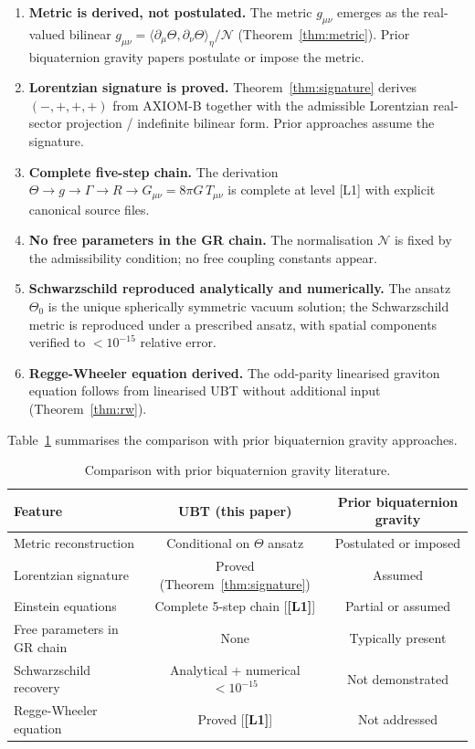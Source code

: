\documentclass[12pt,a4paper]{article}
\theoremstyle{definition}
\theoremstyle{remark}
\newcommand{\Lone}{\textbf{[L1]}}
\newcommand{\calN}{\mathcal{N}}
\begin{document}
\begin{enumerate}
  \item \textbf{Metric is derived, not postulated.}
        The metric $g_{\mu\nu}$ emerges as the real-valued bilinear
        $g_{\mu\nu} = \langle\partial_\mu\Theta,\partial_\nu\Theta\rangle_\eta/\calN$
        (Theorem~\ref{thm:metric}).
        Prior biquaternion gravity papers postulate or impose the metric.

  \item \textbf{Lorentzian signature is proved.}
        Theorem~\ref{thm:signature} derives $(-,+,+,+)$ from AXIOM-B together with the
        admissible Lorentzian real-sector projection / indefinite bilinear form.
        Prior approaches assume the signature.

  \item \textbf{Complete five-step chain.}
        The derivation $\Theta \to g \to \Gamma \to R \to G_{\mu\nu} = 8\pi G\,T_{\mu\nu}$
        is complete at level [L1] with explicit canonical source files.

  \item \textbf{No free parameters in the GR chain.}
        The normalisation $\calN$ is fixed by the admissibility condition;
        no free coupling constants appear.

  \item \textbf{Schwarzschild reproduced analytically and numerically.}
        The ansatz $\Theta_0$ is the unique spherically symmetric vacuum solution;
        the Schwarzschild metric is reproduced under a prescribed ansatz, with spatial components verified to
        $< 10^{-15}$ relative error.

  \item \textbf{Regge-Wheeler equation derived.}
        The odd-parity linearised graviton equation follows from linearised
        UBT without additional input (Theorem~\ref{thm:rw}).
\end{enumerate}

Table~\ref{tab:novelty} summarises the comparison with prior biquaternion
gravity approaches.

\begin{table}[ht]
\centering
\caption{Comparison with prior biquaternion gravity literature.}
\label{tab:novelty}
\begin{tabular}{lcc}
\toprule
\textbf{Feature} & \textbf{UBT (this paper)} & \textbf{Prior biquaternion gravity} \\
\midrule
Metric reconstruction & Conditional on $\Theta$ ansatz & Postulated or imposed \\
Lorentzian signature & Proved (Theorem~\ref{thm:signature}) & Assumed \\
Einstein equations & Complete 5-step chain [\Lone] & Partial or assumed \\
Free parameters in GR chain & None & Typically present \\
Schwarzschild recovery & Analytical + numerical $<10^{-15}$ & Not demonstrated \\
Regge-Wheeler equation & Proved [\Lone] & Not addressed \\
\bottomrule
\end{tabular}
\end{table}
\end{document}
